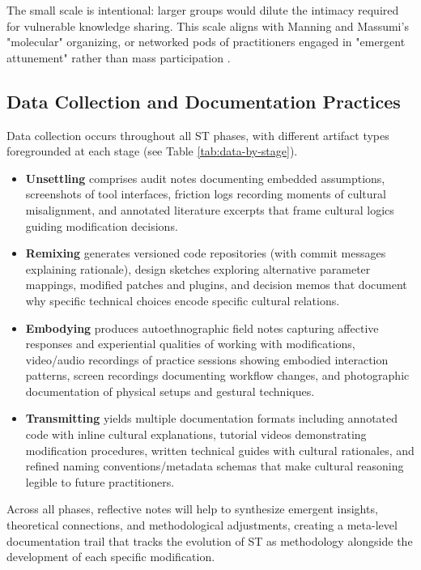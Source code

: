 The small scale is intentional: larger groups would dilute the intimacy required for vulnerable knowledge sharing. This scale aligns with Manning and Massumi's "molecular" organizing, or networked pods of practitioners engaged in "emergent attunement" rather than mass participation \parencites[106-110]{Manning_Massumi_2014}.

\subsection{Data Collection and Documentation Practices}

Data collection occurs throughout all ST phases, with different artifact types foregrounded at each stage (see Table \ref{tab:data-by-stage}). 
\begin{itemize}[noitemsep]
	\item \textbf{Unsettling} comprises audit notes documenting embedded assumptions, screenshots of tool interfaces, friction logs recording moments of cultural misalignment, and annotated literature excerpts that frame cultural logics guiding modification decisions.
	\item \textbf{Remixing} generates versioned code repositories (with commit messages explaining rationale), design sketches exploring alternative parameter mappings, modified patches and plugins, and decision memos that document why specific technical choices encode specific cultural relations.
	\item  \textbf{Embodying} produces autoethnographic field notes capturing affective responses and experiential qualities of working with modifications, video/audio recordings of practice sessions showing embodied interaction patterns, screen recordings documenting workflow changes, and photographic documentation of physical setups and gestural techniques.
	\item \textbf{Transmitting} yields multiple documentation formats including annotated code with inline cultural explanations, tutorial videos demonstrating modification procedures, written technical guides with cultural rationales, and refined naming conventions/metadata schemas that make cultural reasoning legible to future practitioners.
\end{itemize}
  Across all phases, reflective notes will help to synthesize emergent insights, theoretical connections, and methodological adjustments, creating a meta-level documentation trail that tracks the evolution of ST as methodology alongside the development of each specific modification.


